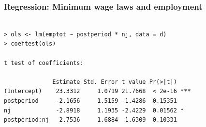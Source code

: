 \documentclass[xcolor=dvipsnames]{beamer}
\newtheorem{esti}{Estimator}
\begin{document}
\begin{frame}[fragile]
  \frametitle{Regression: Minimum wage laws and employment}

\footnotesize
\begin{verbatim}

> ols <- lm(emptot ~ postperiod * nj, data = d)
> coeftest(ols)

t test of coefficients:

              Estimate Std. Error t value Pr(>|t|)    
(Intercept)    23.3312     1.0719 21.7668  < 2e-16 ***
postperiod     -2.1656     1.5159 -1.4286  0.15351    
nj             -2.8918     1.1935 -2.4229  0.01562 *  
postperiod:nj   2.7536     1.6884  1.6309  0.10331    
\end{verbatim}
\end{frame}

\end{document}
